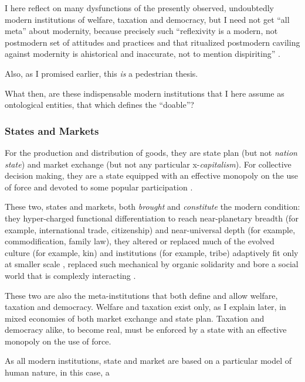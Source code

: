 \begin{enumerate}
	I here reflect on many dysfunctions of the presently observed, undoubtedly modern institutions of welfare, taxation and democracy, but I need not get ``all meta'' about modernity, because precisely such ``reflexivity is a modern, not postmodern set of attitudes and practices and that ritualized postmodern caviling against modernity is ahistorical and inaccurate, not to mention dispiriting'' \citep[1119]{Sica-1997-aa}.

	Also, as I promised earlier, this \emph{is} a pedestrian thesis.
\end{enumerate}

What then, are these indispensable modern institutions that I here assume as ontological entities, that which defines the ``doable''?

\subsubsection{States and Markets}
For the production and distribution of goods, they are state plan (but not \emph{nation state}) and market exchange (but not any particular x-\emph{capitalism}).
For collective decision making, they are a state equipped with an effective monopoly on the use of force and devoted to some popular participation \citep[compare][96]{Giddens1998}.

These two, states and markets, both \emph{brought} and \emph{constitute} the modern condition:
they hyper-charged functional differentiation \citep{Smith-1776-lq} to reach near-planetary breadth (for example, international trade, citizenship) and near-universal depth (for example, commodification, family law), they altered or replaced much of the evolved culture (for example, kin) and institutions (for example, tribe) adaptively fit only at smaller scale \citep{Diamond1997}, replaced such mechanical by organic solidarity \citep{Durkheim-1893-aa} and bore a social world that is complexly interacting \citep[for example,][]{Merton-1968-aa,Merton-1936-aa}.

These two are also the meta-institutions that both define and allow welfare, taxation and democracy.
Welfare and taxation exist only, as I explain later, in mixed economies of both market exchange and state plan.
Taxation and democracy alike, to become real, must be enforced by a state with an effective monopoly on the use of force.%

As all modern institutions, state and market are based on a particular model of human nature, in this case, a

